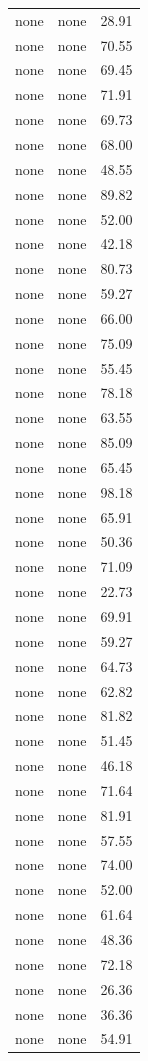 \begin{tabular}{rrr}
none & none & 28.91 \\
none & none & 70.55 \\
none & none & 69.45 \\
none & none & 71.91 \\
none & none & 69.73 \\
none & none & 68.00 \\
none & none & 48.55 \\
none & none & 89.82 \\
none & none & 52.00 \\
none & none & 42.18 \\
none & none & 80.73 \\
none & none & 59.27 \\
none & none & 66.00 \\
none & none & 75.09 \\
none & none & 55.45 \\
none & none & 78.18 \\
none & none & 63.55 \\
none & none & 85.09 \\
none & none & 65.45 \\
none & none & 98.18 \\
none & none & 65.91 \\
none & none & 50.36 \\
none & none & 71.09 \\
none & none & 22.73 \\
none & none & 69.91 \\
none & none & 59.27 \\
none & none & 64.73 \\
none & none & 62.82 \\
none & none & 81.82 \\
none & none & 51.45 \\
none & none & 46.18 \\
none & none & 71.64 \\
none & none & 81.91 \\
none & none & 57.55 \\
none & none & 74.00 \\
none & none & 52.00 \\
none & none & 61.64 \\
none & none & 48.36 \\
none & none & 72.18 \\
none & none & 26.36 \\
none & none & 36.36 \\
none & none & 54.91 \\

\end{tabular}
